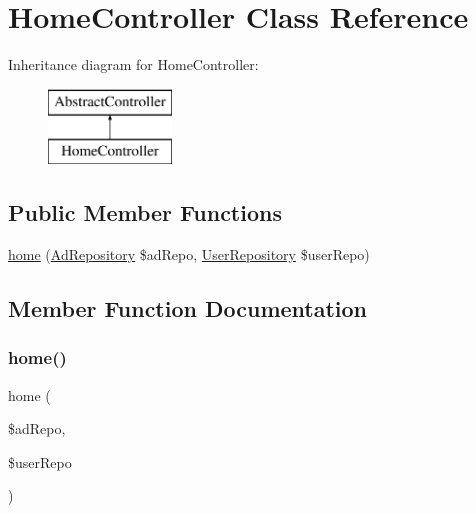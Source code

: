 \hypertarget{class_app_1_1_controller_1_1_home_controller}{}\section{Home\+Controller Class Reference}
\label{class_app_1_1_controller_1_1_home_controller}
Inheritance diagram for Home\+Controller\+:\begin{figure}[H]
\begin{center}
\leavevmode
\includegraphics[height=2.000000cm]{class_app_1_1_controller_1_1_home_controller}
\end{center}
\end{figure}
\subsection*{Public Member Functions}
\begin{DoxyCompactItemize}
\item 
\mbox{\hyperlink{class_app_1_1_controller_1_1_home_controller_a87749614244a60a0f2ff9fab2acc3284}{home}} (\mbox{\hyperlink{class_app_1_1_repository_1_1_ad_repository}{Ad\+Repository}} \$ad\+Repo, \mbox{\hyperlink{class_app_1_1_repository_1_1_user_repository}{User\+Repository}} \$user\+Repo)
\end{DoxyCompactItemize}


\subsection{Member Function Documentation}
\mbox{\label{class_app_1_1_controller_1_1_home_controller_a87749614244a60a0f2ff9fab2acc3284}} 
\subsubsection{\texorpdfstring{home()}{home()}}
{\footnotesize\ttfamily home (\begin{DoxyParamCaption}\item[{\mbox{\hyperlink{class_app_1_1_repository_1_1_ad_repository}{Ad\+Repository}}}]{\$ad\+Repo,  }\item[{\mbox{\hyperlink{class_app_1_1_repository_1_1_user_repository}{User\+Repository}}}]{\$user\+Repo }\end{DoxyParamCaption})}

